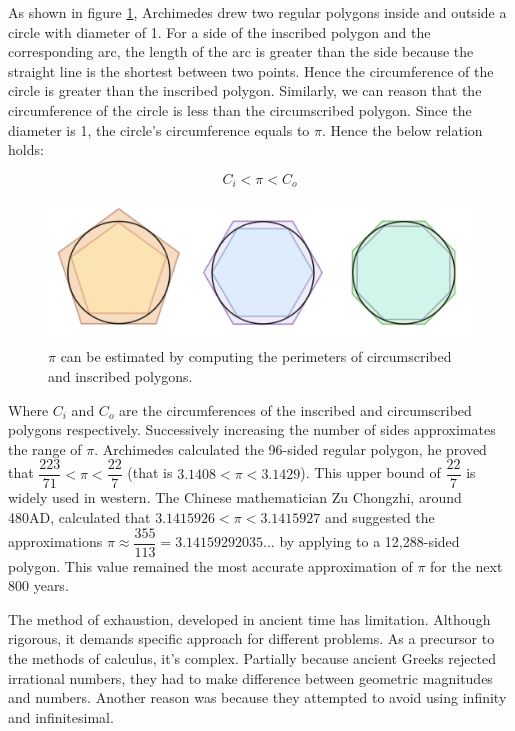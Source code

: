 \documentclass{article}
\begin{document}
As shown in figure \ref{fig:pi-exhaustion}, Archimedes drew two regular polygons inside and outside a circle with diameter of 1. For a side of the inscribed polygon and the corresponding arc, the length of the arc is greater than the side because the straight line is the shortest between two points. Hence the circumference of the circle is greater than the inscribed polygon. Similarly, we can reason that the circumference of the circle is less than the circumscribed polygon. Since the diameter is 1, the circle's circumference equals to $\pi$. Hence the below relation holds:

\[
  C_i < \pi < C_o
\]

\begin{figure}[htbp]
 \centering
 \includegraphics[scale=0.5]{img/pi-exhaustion.png}
 \caption{$\pi$ can be estimated by computing the perimeters of circumscribed and inscribed polygons.}
 \label{fig:pi-exhaustion}
\end{figure}

Where $C_i$ and $C_o$ are the circumferences of the inscribed and circumscribed polygons respectively. Successively increasing the number of sides approximates the range of $\pi$. Archimedes calculated the 96-sided regular polygon, he proved that $\dfrac{223}{71} < \pi < \dfrac{22}{7}$ (that is $3.1408 < \pi < 3.1429$). This upper bound of $\dfrac{22}{7}$ is widely used in western. The Chinese mathematician Zu Chongzhi, around 480AD, calculated that $3.1415926 < \pi < 3.1415927$ and suggested the approximations $\pi \approx \dfrac{355}{113} = 3.14159292035...$ by applying to a 12,288-sided polygon. This value remained the most accurate approximation of $\pi$ for the next 800 years.

The method of exhaustion, developed in ancient time has limitation. Although rigorous, it demands specific approach for different problems. As a precursor to the methods of calculus, it's complex. Partially because ancient Greeks rejected irrational numbers, they had to make difference between geometric magnitudes and numbers. Another reason was because they attempted to avoid using infinity and infinitesimal.
\end{document}
